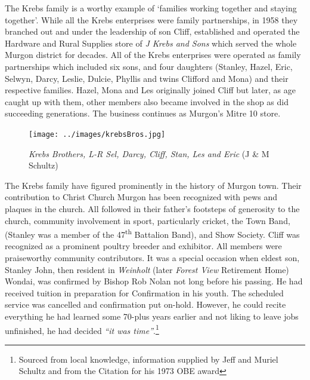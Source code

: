 The Krebs family is a worthy example of `families working together and staying together'. While all the Krebs enterprises were family partnerships, in 1958 they branched out and under the leadership of son Cliff, established and operated the Hardware and Rural Supplies store of \emph{J Krebs and Sons} which served the whole Murgon district for decades. All of the Krebs enterprises were operated as family partnerships which included six sons, and four daughters (Stanley, Hazel, Eric, Selwyn, Darcy, Leslie, Dulcie, Phyllis and twins Clifford and Mona) and their respective families. Hazel, Mona and Les originally joined Cliff but later, as age caught up with them, other members also became involved in the shop as did succeeding generations. The business continues as Murgon's Mitre 10 store.









\begin{figure}
\begin{center}
\texttt{[image: ../images/krebsBros.jpg]}
\caption{{\itshape Krebs Brothers, L-R Sel, Darcy, Cliff, Stan, Les and Eric} {\scriptsize(J \& M Schultz)}}
\end{center}
\end{figure}




The Krebs family have figured prominently in the history of Murgon town. Their contribution to Christ Church Murgon has been recognized with pews and plaques in the church. All followed in their father's footsteps of generosity to the church, community involvement in sport, particularly cricket, the Town Band, (Stanley was a member of the 47\textsuperscript{th} Battalion Band), and Show Society. Cliff was recognized as a prominent poultry breeder and exhibitor. All members were praiseworthy community contributors. It was a special occasion when eldest son, Stanley John, then resident in \emph{Weinholt} (later \emph{Forest View} Retirement Home) Wondai, was confirmed by Bishop Rob Nolan not long before his passing. He had received tuition in preparation for Confirmation in his youth. The scheduled service was cancelled and confirmation put on-hold. However, he could recite everything he had learned some 70-plus years earlier and not liking to leave jobs unfinished, he had decided \emph{``it was time''}.\footnote{Sourced from local knowledge, information supplied by Jeff and Muriel Schultz and from the Citation for his 1973 OBE award}


